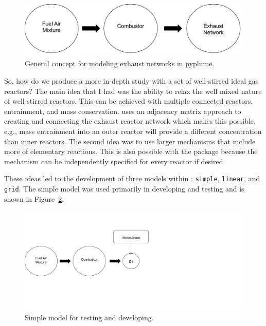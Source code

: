 \documentclass[smallextended,referee]{svjour3}
\begin{document}
\begin{figure}[htb!]
    \centering
    \includegraphics[scale=\SCALE]{examples/report/figures/general.pdf}

    \caption{General concept for modeling exhaust networks in pyplume.}
    \label{fig:general}
\end{figure}

So, how do we produce a more in-depth study with a set of well-stirred ideal gas reactors? The main idea that I had was the ability to relax the well mixed nature of well-stirred reactors. This can be achieved with multiple connected reactors, entrainment, and mass conservation. \pyplume{} uses an adjacency matrix approach to creating and connecting the exhaust reactor network which makes this possible, e.g., mass entrainment into an outer reactor will provide a different concentration than inner reactors. The second idea was to use larger mechanisms that include more of elementary reactions. This is also possible with the package because the mechanism can be independently specified for every reactor if desired. 

These ideas led to the development of three models within \pyplume: \texttt{simple}, \texttt{linear}, and \texttt{grid}. The simple model was used primarily in developing and testing and is shown in Figure~\ref{fig:simple}. 

\begin{figure}[htb!]
    \centering
    \includegraphics[scale=\SCALE,trim=1cm 5cm 1cm 4cm]{examples/report/figures/simple.pdf}

    \caption{Simple model for testing and developing.}
    \label{fig:simple}
\end{figure}
\end{document}

